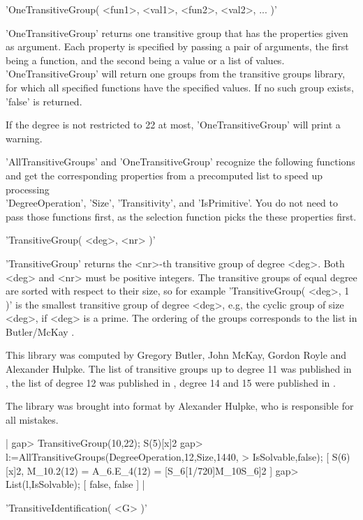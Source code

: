 \vspace{5mm}
'OneTransitiveGroup( <fun1>, <val1>, <fun2>, <val2>, ... )'

'OneTransitiveGroup' returns one transitive group that has the properties
given  as  argument.  Each  property  is specified by   passing a pair of
arguments, the first being a function, and the second  being a value or a
list of values.   'OneTransitiveGroup'  will return one groups   from the
transitive  groups library, for which  all  specified functions have  the
specified values.  If no such group exists, 'false' is returned.

If the degree is not restricted  to 22 at most, 'OneTransitiveGroup' will
print a warning.

'AllTransitiveGroups'  and 'OneTransitiveGroup'   recognize the following
functions and get the corresponding properties from a precomputed list to
speed up  processing{\:}\\ 'DegreeOperation', 'Size', 'Transitivity', and
'IsPrimitive'.  You do not  need to pass   those functions first,  as the
selection function picks the these properties first.

\vspace{5mm}
'TransitiveGroup( <deg>, <nr> )'

'TransitiveGroup' returns the  <nr>-th transitive group of  degree <deg>.
Both <deg> and <nr> must be positive integers.   The transitive groups of
equal  degree are  sorted with  respect  to  their  size, so for  example
'TransitiveGroup( <deg>, 1 )' is the smallest  transitive group of degree
<deg>, e.g, the cyclic group  of size <deg>, if <deg>   is a prime.   The
ordering  of  the groups    corresponds  to  the list  in    Butler/McKay
\cite{BM83}.

This library was computed by Gregory Butler, John McKay, Gordon Royle and
Alexander Hulpke. The  list    of transitive groups   up   to degree  11
was  published in \cite{BM83}, the list of degree  12 was published in
\cite{Roy87}, degree 14 and 15 were published in \cite{But93}.

The library was  brought into {\GAP} format by  Alexander  Hulpke, who is
responsible for all mistakes.

|    gap> TransitiveGroup(10,22);
    S(5)[x]2
    gap> l:=AllTransitiveGroups(DegreeOperation,12,Size,1440,
    > IsSolvable,false);
    [ S(6)[x]2, M_10.2(12) = A_6.E_4(12) = [S_6[1/720]{M_10}S_6]2 ]
    gap> List(l,IsSolvable);
    [ false, false ] |

\vspace{5mm}
'TransitiveIdentification( <G> )'

